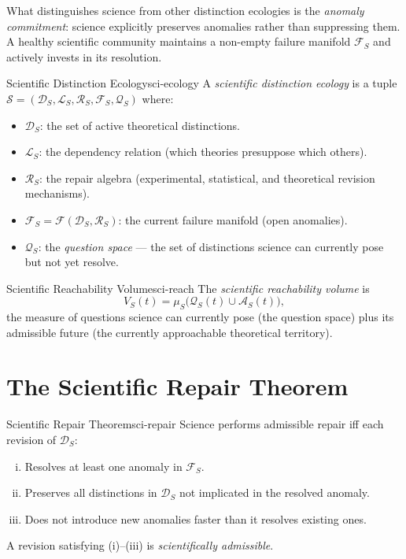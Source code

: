 \documentclass[12pt,twoside,openright]{book}
\newcommand{\adm}{\mathcal{A}}
\begin{document}
What distinguishes science from other distinction
ecologies is the \emph{anomaly commitment}: science
explicitly preserves anomalies rather than suppressing
them. A healthy scientific community maintains a
non-empty failure manifold $\mathcal{F}_S$ and
actively invests in its resolution.

\begin{definition}{Scientific Distinction Ecology}{sci-ecology}
  A \emph{scientific distinction ecology} is a tuple
  $\mathcal{S} = (\mathcal{D}_S, \mathcal{L}_S,
  \mathcal{R}_S, \mathcal{F}_S, \mathcal{Q}_S)$ where:
  \begin{itemize}[nosep]
    \item $\mathcal{D}_S$: the set of active theoretical
          distinctions.
    \item $\mathcal{L}_S$: the dependency relation
          (which theories presuppose which others).
    \item $\mathcal{R}_S$: the repair algebra
          (experimental, statistical, and theoretical
          revision mechanisms).
    \item $\mathcal{F}_S = \mathcal{F}(\mathcal{D}_S,
          \mathcal{R}_S)$: the current failure manifold
          (open anomalies).
    \item $\mathcal{Q}_S$: the \emph{question space} —
          the set of distinctions science can currently
          pose but not yet resolve.
  \end{itemize}
\end{definition}

\begin{definition}{Scientific Reachability Volume}{sci-reach}
  The \emph{scientific reachability volume} is
  \[
    V_S(t)
    = \mu_S\!\bigl(\mathcal{Q}_S(t) \cup \adm_S(t)\bigr),
  \]
  the measure of questions science can currently pose
  (the question space) plus its admissible future
  (the currently approachable theoretical territory).
\end{definition}

\section{The Scientific Repair Theorem}

\begin{theorem}{Scientific Repair Theorem}{sci-repair}
  Science performs admissible repair iff each revision
  of $\mathcal{D}_S$:
  \begin{enumerate}[(i)]
    \item Resolves at least one anomaly in $\mathcal{F}_S$.
    \item Preserves all distinctions in $\mathcal{D}_S$
          not implicated in the resolved anomaly.
    \item Does not introduce new anomalies faster than
          it resolves existing ones.
  \end{enumerate}
  A revision satisfying (i)--(iii) is
  \emph{scientifically admissible}.
\end{theorem}
\end{document}
